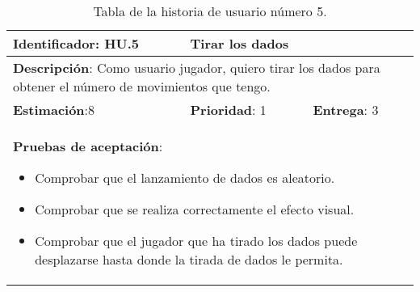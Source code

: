 \begin{table}[h]
  \begin{center}
    \begin{tabular}{|p{4cm}|p{4cm}|p{4cm}|}

    \hline
    \textbf{Identificador}: HU.5
    & \multicolumn{2}{p{8cm}|}{Tirar los dados}\\

    \hline
    \multicolumn{3}{|p{12cm}|}{\textbf{Descripción}: Como usuario jugador, quiero tirar los dados para obtener el número de movimientos que tengo.}\\

    \hline
    \textbf{Estimación}:8
    & \textbf{Prioridad}: 1
    & \textbf{Entrega}: 3\\

    \hline
    \multicolumn{3}{|p{12cm}|}{\textbf{Pruebas de aceptación}:
      \begin{itemize}
        \item Comprobar que el lanzamiento de dados es aleatorio.
        \item Comprobar que se realiza correctamente el efecto visual.
        \item Comprobar que el jugador que ha tirado los dados puede desplazarse hasta donde la tirada de dados le permita.
      \end{itemize}
    }\\

    \hline

    \end{tabular}

    \caption{Tabla de la historia de usuario número 5.}
    \label{tabla-hu5}

  \end{center}
\end{table}

